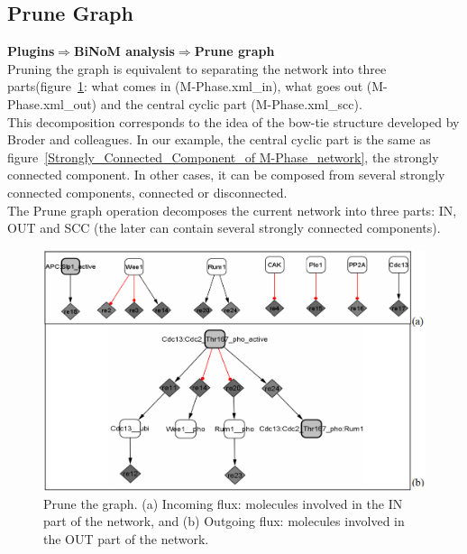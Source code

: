 \subsection{Prune Graph}
\textbf{Plugins$\Rightarrow$BiNoM analysis$\Rightarrow$Prune graph}\\
Pruning the graph is equivalent to separating the network into three parts(figure~\ref{Prune_the_graph}: what comes in (M-Phase.xml\_in), what goes out (M-Phase.xml\_out) and the central cyclic part (M-Phase.xml\_scc).
\\This decomposition corresponds to the idea of the bow-tie structure developed by Broder and colleagues\cite{broder2000graph}. In our example, the central cyclic part is the same as figure~\ref{Strongly_Connected_Component_of M-Phase_network}, the strongly connected component. In other cases, it can be composed from several strongly connected components, connected or disconnected.\\
The Prune graph operation decomposes the current network into three parts: IN, OUT and SCC (the later can contain several strongly connected components).
\begin{figure}
\centering
\includegraphics[width=14 cm]{graphics/Prune_the_graph}
\caption{Prune the graph. (a) Incoming flux: molecules involved in the IN part of the network, and (b) Outgoing flux: molecules involved in the OUT part of the network.}
\label{Prune_the_graph}
\end{figure}

